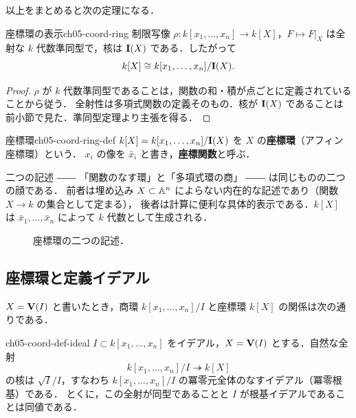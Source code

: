 以上をまとめると次の定理になる．

\begin{myprop}{座標環の表示}{ch05-coord-ring}
制限写像 $\rho: k[x_1,\dots,x_n]\to k[X]$，$F\mapsto F|_X$ は全射な $k$ 代数準同型で，核は $\mathbf{I}(X)$ である．したがって
\[
  k[X]\cong k[x_1,\dots,x_n]/\mathbf{I}(X).
\]
\end{myprop}

\begin{proof}
$\rho$ が $k$ 代数準同型であることは，関数の和・積が点ごとに定義されていることから従う．
全射性は多項式関数の定義そのもの．核が $\mathbf{I}(X)$ であることは前小節で見た．準同型定理より主張を得る．
\end{proof}

\begin{mydef}{座標環}{ch05-coord-ring-def}
$k[X]=k[x_1,\dots,x_n]/\mathbf{I}(X)$ を $X$ の\textbf{座標環}（アフィン座標環）という．
$x_i$ の像を $\bar x_i$ と書き，\textbf{座標関数}と呼ぶ．
\end{mydef}

二つの記述 ―― 「関数のなす環」と「多項式環の商」 ―― は同じものの二つの顔である．
前者は埋め込み $X\subset\mathbb{A}^n$ によらない内在的な記述であり（関数 $X\to k$ の集合として定まる），
後者は計算に便利な具体的表示である．$k[X]$ は $\bar x_1,\dots,\bar x_n$ によって $k$ 代数として生成される．

\begin{figure}[H]
\centering
{}
\caption{座標環の二つの記述．}
\end{figure}

\subsection{座標環と定義イデアル}

$X=\mathbf{V}(I)$ と書いたとき，商環 $k[x_1,\dots,x_n]/I$ と座標環 $k[X]$ の関係は次の通りである．

\begin{myprop}{}{ch05-coord-def-ideal}
$I\subset k[x_1,\dots,x_n]$ をイデアル，$X=\mathbf{V}(I)$ とする．自然な全射
\[
  k[x_1,\dots,x_n]/I\twoheadrightarrow k[X]
\]
の核は $\sqrt I/I$，すなわち $k[x_1,\dots,x_n]/I$ の冪零元全体のなすイデアル（冪零根基）である．
とくに，この全射が同型であることと $I$ が根基イデアルであることは同値である．
\end{myprop}

